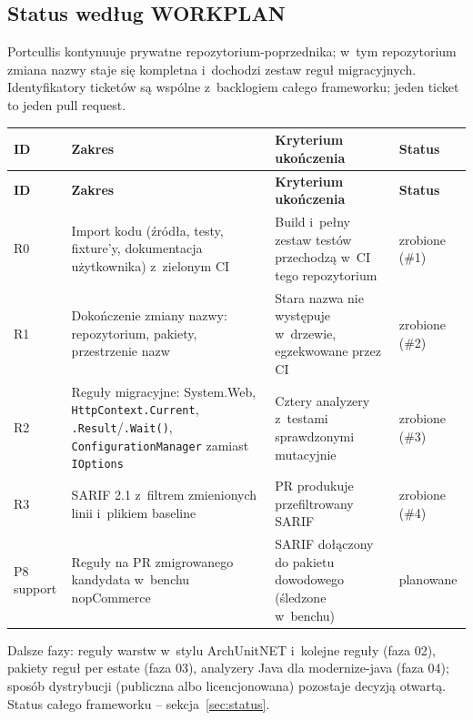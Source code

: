 
\subsection{Status według WORKPLAN}\label{sec:portcullis-status}

Portcullis kontynuuje prywatne repozytorium-poprzednika; w~tym repozytorium zmiana nazwy
staje się kompletna i~dochodzi zestaw reguł migracyjnych. Identyfikatory ticketów są wspólne
z~backlogiem całego frameworku; jeden ticket to jeden pull request.

\begin{xltabular}{\linewidth}{@{}l >{\raggedright\arraybackslash}X >{\raggedright\arraybackslash}p{4.4cm} l@{}}
\toprule
\textbf{ID} & \textbf{Zakres} & \textbf{Kryterium ukończenia} & \textbf{Status} \\
\midrule
\endfirsthead
\toprule
\textbf{ID} & \textbf{Zakres} & \textbf{Kryterium ukończenia} & \textbf{Status} \\
\midrule
\endhead
R0 & Import kodu (źródła, testy, fixture'y, dokumentacja użytkownika) z~zielonym CI & Build i~pełny zestaw testów przechodzą w~CI tego repozytorium & zrobione (\#1) \\
R1 & Dokończenie zmiany nazwy: repozytorium, pakiety, przestrzenie nazw & Stara nazwa nie występuje w~drzewie, egzekwowane przez CI & zrobione (\#2) \\
R2 & Reguły migracyjne: System.Web, \texttt{HttpContext.Current}, \texttt{.Result}/\texttt{.Wait()}, \texttt{ConfigurationManager} zamiast \texttt{IOptions} & Cztery analyzery z~testami sprawdzonymi mutacyjnie & zrobione (\#3) \\
R3 & SARIF 2.1 z~filtrem zmienionych linii i~plikiem baseline & PR produkuje przefiltrowany SARIF & zrobione (\#4) \\
P8 support & Reguły na PR zmigrowanego kandydata w~benchu nopCommerce & SARIF dołączony do pakietu dowodowego (śledzone w~benchu) & planowane \\
\bottomrule
\end{xltabular}

Dalsze fazy: reguły warstw w~stylu ArchUnitNET i~kolejne reguły (faza 02), pakiety reguł
per estate (faza 03), analyzery Java dla modernize-java (faza 04); sposób dystrybucji
(publiczna albo licencjonowana) pozostaje decyzją otwartą. Status całego frameworku --
sekcja~\ref{sec:status}.

